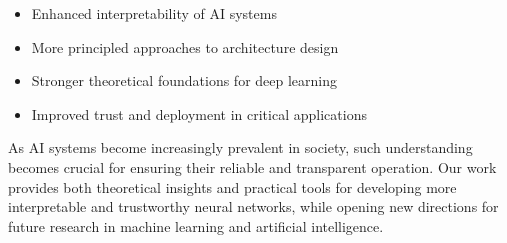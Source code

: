 \begin{itemize}
    \item Enhanced interpretability of AI systems
    \item More principled approaches to architecture design
    \item Stronger theoretical foundations for deep learning
    \item Improved trust and deployment in critical applications
\end{itemize}

As AI systems become increasingly prevalent in society, such understanding becomes crucial for ensuring their reliable and transparent operation. Our work provides both theoretical insights and practical tools for developing more interpretable and trustworthy neural networks, while opening new directions for future research in machine learning and artificial intelligence.